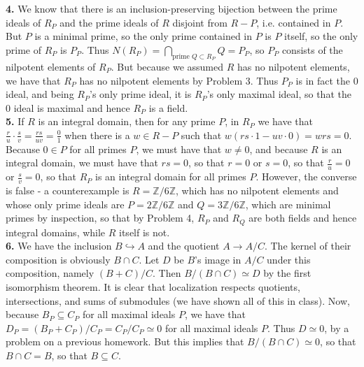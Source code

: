 \documentclass[11pt]{article}
\newcommand{\num}[1]{\noindent \textbf{#1}}
\theoremstyle{definition}
\begin{document}
\num{4.} We know that there is an inclusion-preserving bijection between
the prime ideals of $R_P$ and the prime ideals of $R$ disjoint from $R-P$,
i.e. contained in $P$. But $P$ is a minimal prime, so the only prime
contained in $P$ is $P$ itself, so the only prime of $R_P$ is $P_P$. Thus
$N(R_P)=\bigcap_{\text{prime } Q\subset R_P} Q = P_P$, so $P_P$ consists of
the nilpotent elements of $R_P$. But because we assumed $R$ has no nilpotent
elements, we have that $R_P$ has no nilpotent elements by Problem 3. Thus
$P_P$ is in fact the 0 ideal, and being $R_P$'s only prime ideal, it is
$R_P$'s only maximal ideal, so that the 0 ideal is maximal and hence $R_P$
is a field.     \\

\num{5.} If $R$ is an integral domain, then for any prime $P$, in $R_P$
we have that $\frac{r}{u}\cdot\frac{s}{v}=\frac{rs}{uv}=\frac{0}{1}$ when
there is a $w\in R-P$ such that $w(rs\cdot1-uv\cdot0)=wrs=0$. Because
$0\in P$ for all primes $P$, we must have that $w\neq0$, and because $R$
is an integral domain, we must have that $rs=0$, so that $r=0$ or $s=0$,
so that $\frac{r}{u}=0$ or $\frac{s}{v}=0$, so that $R_P$ is an integral
domain for all primes $P$. However, the converse is false - a counterexample
is $R=\mathbb{Z}/6\mathbb{Z}$, which has no nilpotent elements and whose only
prime ideals are $P=2\mathbb{Z}/6\mathbb{Z}$ and $Q=3\mathbb{Z}/6\mathbb{Z}$,
which are minimal primes by inspection, so that by Problem 4, $R_P$ and $R_Q$
are both fields and hence integral domains, while $R$ itself is not.    \\

\num{6.} We have the inclusion $B\hookrightarrow A$ and the quotient
$A\rightarrow A/C$. The kernel of their composition is obviously $B\cap C$. Let
$D$ be $B$'s image in $A/C$ under this composition, namely $(B+C)/C$. Then
$B/(B\cap C)\simeq D$ by the first isomorphism theorem. It is clear that
localization respects quotients, intersections, and sums of submodules
(we have shown all of this in class). Now, because $B_P\subseteq C_P$ for
all maximal ideals $P$, we have that $D_P=(B_P+C_P)/C_P=C_P/C_P\simeq0$
for all maximal ideals $P$. Thus $D\simeq 0$, by a problem on a previous
homework. But this implies that $B/(B\cap C)\simeq 0$, so that $B\cap C=
B$, so that $B\subseteq C$.   \\
\end{document}
